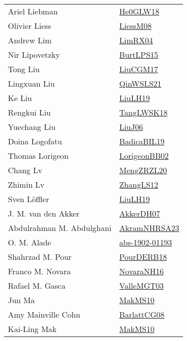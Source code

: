 {\begin{longtable}{p{4cm}p{20cm}}
Ariel Liebman & \href{papers/He0GLW18.pdf}{He0GLW18}\cite{He0GLW18} \\
Olivier Liess & \href{articles/LiessM08.pdf}{LiessM08}\cite{LiessM08} \\
Andrew Lim & \href{papers/LimRX04.pdf}{LimRX04}\cite{LimRX04} \\
Nir Lipovetzky & \href{papers/BurtLPS15.pdf}{BurtLPS15}\cite{BurtLPS15} \\
Tong Liu & \href{papers/LiuCGM17.pdf}{LiuCGM17}\cite{LiuCGM17} \\
Lingxuan Liu & \href{articles/QinWSLS21.pdf}{QinWSLS21}\cite{QinWSLS21} \\
Ke Liu & \href{papers/LiuLH19.pdf}{LiuLH19}\cite{LiuLH19} \\
Rengkui Liu & \href{}{TangLWSK18}\cite{TangLWSK18} \\
Yuechang Liu & \href{papers/LiuJ06.pdf}{LiuJ06}\cite{LiuJ06} \\
Doina Logofatu & \href{papers/BadicaBIL19.pdf}{BadicaBIL19}\cite{BadicaBIL19} \\
Thomas Lorigeon & \href{}{LorigeonBB02}\cite{LorigeonBB02} \\
Chang Lv & \href{articles/MengZRZL20.pdf}{MengZRZL20}\cite{MengZRZL20} \\
Zhimin Lv & \href{papers/ZhangLS12.pdf}{ZhangLS12}\cite{ZhangLS12} \\
Sven L{\"{o}}ffler & \href{papers/LiuLH19.pdf}{LiuLH19}\cite{LiuLH19} \\
J. M. van den Akker & \href{papers/AkkerDH07.pdf}{AkkerDH07}\cite{AkkerDH07} \\
Abdulrahman M. Abdulghani & \href{articles/AkramNHRSA23.pdf}{AkramNHRSA23}\cite{AkramNHRSA23} \\
O. M. Alade & \href{articles/abs-1902-01193.pdf}{abs-1902-01193}\cite{abs-1902-01193} \\
Shahrzad M. Pour & \href{articles/PourDERB18.pdf}{PourDERB18}\cite{PourDERB18} \\
Franco M. Novara & \href{articles/NovaraNH16.pdf}{NovaraNH16}\cite{NovaraNH16} \\
Rafael M. Gasca & \href{papers/ValleMGT03.pdf}{ValleMGT03}\cite{ValleMGT03} \\
Jun Ma & \href{papers/MakMS10.pdf}{MakMS10}\cite{MakMS10} \\
Amy Mainville Cohn & \href{papers/BarlattCG08.pdf}{BarlattCG08}\cite{BarlattCG08} \\
Kai{-}Ling Mak & \href{papers/MakMS10.pdf}{MakMS10}\cite{MakMS10} \\

\end{longtable}}
